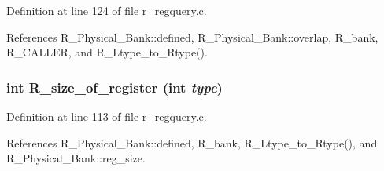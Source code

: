 Definition at line 124 of file r\_\-regquery.c.

References R\_\-Physical\_\-Bank::defined, R\_\-Physical\_\-Bank::overlap, R\_\-bank, R\_\-CALLER, and R\_\-Ltype\_\-to\_\-Rtype().
\subsubsection{\setlength{\rightskip}{0pt plus 5cm}int R\_\-size\_\-of\_\-register (int {\em type})}\label{r__regquery_8c_b2aac7e5b0f1244101fb93a72ea947e5}




Definition at line 113 of file r\_\-regquery.c.

References R\_\-Physical\_\-Bank::defined, R\_\-bank, R\_\-Ltype\_\-to\_\-Rtype(), and R\_\-Physical\_\-Bank::reg\_\-size.